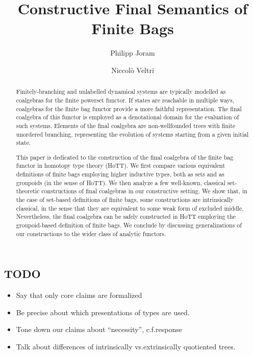 \documentclass[a4paper,USenglish,cleveref]{lipics-v2021}
\title{Constructive Final Semantics of Finite Bags}
\author{Philipp Joram}%
  {Department of Software Science, Tallinn University of Technology, Estonia}
  {philipp@cs.ioc.ee}%
  {https://orcid.org/0000-0002-0448-7907}%
  {}
\author{Niccol{\`o} Veltri}%
  {Department of Software Science, Tallinn University of Technology, Estonia}
  {niccolo@cs.ioc.ee}%
  {https://orcid.org/0000-0002-7230-3436}%
  {}
\begin{document}
\maketitle

\begin{abstract}
  Finitely-branching and unlabelled dynamical systems are typically modelled as coalgebras for the finite powerset functor.
  If states are reachable in multiple ways, coalgebras for the finite bag functor provide a more faithful representation.
  The final coalgebra of this functor is employed as a denotational domain for the evaluation of such systems.
  Elements of the final coalgebra are non-wellfounded trees with finite unordered branching,
  representing the evolution of systems starting from a given initial state.

  This paper is dedicated to the construction of the final coalgebra of the finite bag functor in homotopy type theory (HoTT).
  We first compare various equivalent definitions of finite bags employing higher inductive types, both as sets and as groupoids (in the sense of HoTT).
  We then analyze a few well-known, classical set-theoretic constructions of final coalgebras in our constructive setting.
  We show that, in the case of set-based definitions of finite bags,
  some constructions are intrinsically classical, in the sense that they are equivalent to some weak form of excluded middle.
  Nevertheless, the final coalgebra can be safely constructed in HoTT employing the groupoid-based definition of finite bags.
  We conclude by discussing generalizations of our constructions to the wider class of analytic functors.

\end{abstract}

\setcounter{tocdepth}{1}

\subsection{TODO}

\begin{itemize}
  \item
    Say that only core claims are formalized
  \item
    Be precise about which presentations of types are used.
  \item
    Tone down our claims about \enquote{necessity}, c.f.\@ response
  \item
    Talk about differences of intrinsically vs.\@ extrinsically quotiented trees.
\end{itemize}
\end{document}
